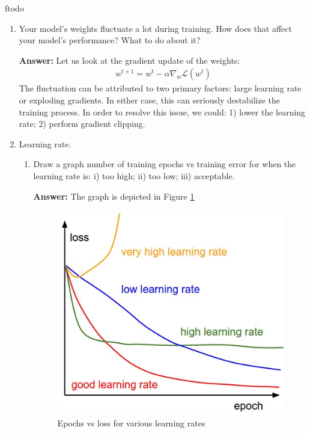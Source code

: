ƒtodo\documentclass{article}
\newenvironment{QandA}{\begin{enumerate}[label=\arabic*.]}{\end{enumerate}}
\newenvironment{InnerQandA}{\begin{enumerate}[label=\roman*.]}{\end{enumerate}}
\newenvironment{answer}{\par\normalfont \textbf{Answer:}}{}
\begin{document}
\begin{QandA}
\begin{answer}
        (Source: \href{https://stats.stackexchange.com/questions/242004/why-do-neural-network-researchers-care-about-epochs}{StackExchange})
    \end{answer}

    \item Your model’s weights fluctuate a lot during training. How does that affect your model’s performance? What to do about it?
    \begin{answer}
        Let us look at the gradient update of the weights:
        \begin{align*}
            w^{t+1} = w^t - \alpha \nabla_w \mathcal{L}(w^t)
        \end{align*}
        The fluctuation can be attributed to two primary factors: large learning rate or exploding gradients. In either case, this can seriously destabilize the training process. In order to resolve this issue, we could: 1) lower the learning rate; 2) perform gradient clipping. 
    \end{answer}

    \item Learning rate.
    \begin{InnerQandA}
        \item Draw a graph number of training epochs vs training error for when the learning rate is: i) too high; ii) too low; iii) acceptable.
        \begin{answer}
            The graph is depicted in Figure \ref{learning-rate-epochs}
        \end{answer}
        \begin{figure}[h!]
            \centering
            \includegraphics[width=0.5\linewidth]{img/learning-rate-epochs.jpeg}
            \caption{Epochs vs loss for various learning rates\footnotemark }
            \label{learning-rate-epochs}
        \end{figure}


\end{InnerQandA}
\end{QandA}
\end{document}
